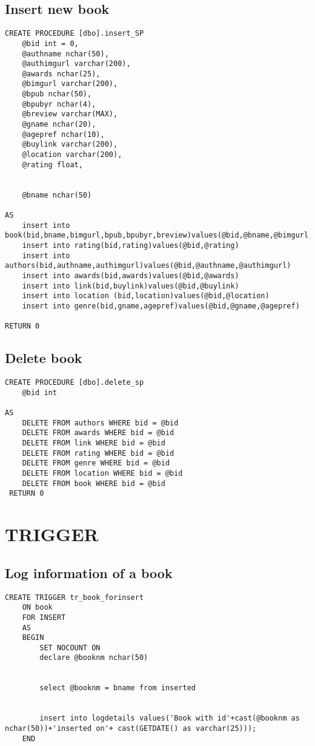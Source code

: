 \subsection{Insert new book}
\begin{lstlisting}
CREATE PROCEDURE [dbo].insert_SP
	@bid int = 0,
	@authname nchar(50),
	@authimgurl varchar(200),
	@awards nchar(25),
	@bimgurl varchar(200),
	@bpub nchar(50),
	@bpubyr nchar(4),
	@breview varchar(MAX),
	@gname nchar(20),
	@agepref nchar(10),
	@buylink varchar(200),
	@location varchar(200),
	@rating float,


	@bname nchar(50)
	
AS
	insert into book(bid,bname,bimgurl,bpub,bpubyr,breview)values(@bid,@bname,@bimgurl,@bpub,@bpubyr,@breview)
	insert into rating(bid,rating)values(@bid,@rating)
	insert into authors(bid,authname,authimgurl)values(@bid,@authname,@authimgurl)
	insert into awards(bid,awards)values(@bid,@awards)
	insert into link(bid,buylink)values(@bid,@buylink)
	insert into location (bid,location)values(@bid,@location)
	insert into genre(bid,gname,agepref)values(@bid,@gname,@agepref)

RETURN 0
\end{lstlisting}
\subsection{Delete book}
\begin{lstlisting}
CREATE PROCEDURE [dbo].delete_sp
	@bid int 
	
AS
	DELETE FROM authors WHERE bid = @bid
	DELETE FROM awards WHERE bid = @bid
	DELETE FROM link WHERE bid = @bid
	DELETE FROM rating WHERE bid = @bid
	DELETE FROM genre WHERE bid = @bid
	DELETE FROM location WHERE bid = @bid
	DELETE FROM book WHERE bid = @bid
 RETURN 0
\end{lstlisting}
\section{TRIGGER}
\subsection{Log information of a book}
\begin{lstlisting}
CREATE TRIGGER tr_book_forinsert
	ON book
	FOR INSERT
	AS
	BEGIN
		SET NOCOUNT ON
		declare @booknm nchar(50)
		

		select @booknm = bname from inserted
		

		insert into logdetails values('Book with id'+cast(@booknm as nchar(50))+'inserted on'+ cast(GETDATE() as varchar(25)));
	END
\end{lstlisting}





